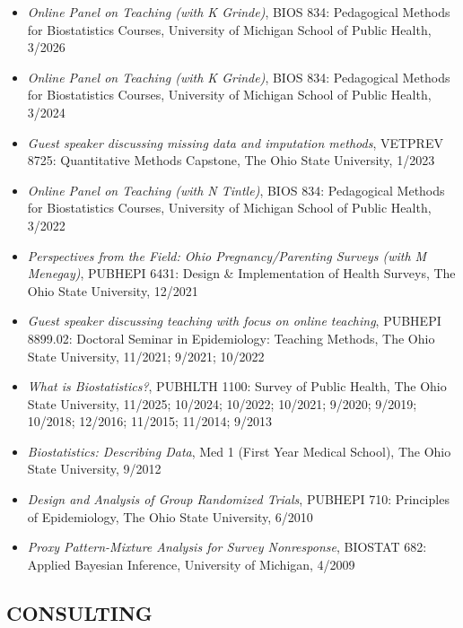 \documentclass[
  english,
  letterpaper,
  DIV=11,
  numbers=noendperiod]{scrartcl}
\providecommand{\tightlist}{%
  \setlength{\itemsep}{0pt}\setlength{\parskip}{0pt}}
\begin{document}
\begin{itemize}
\tightlist
\item
  \emph{Online Panel on Teaching (with K Grinde)}, BIOS 834: Pedagogical
  Methods for Biostatistics Courses, University of Michigan School of
  Public Health, 3/2026
\item
  \emph{Online Panel on Teaching (with K Grinde)}, BIOS 834: Pedagogical
  Methods for Biostatistics Courses, University of Michigan School of
  Public Health, 3/2024
\item
  \emph{Guest speaker discussing missing data and imputation methods},
  VETPREV 8725: Quantitative Methods Capstone, The Ohio State
  University, 1/2023
\item
  \emph{Online Panel on Teaching (with N Tintle)}, BIOS 834: Pedagogical
  Methods for Biostatistics Courses, University of Michigan School of
  Public Health, 3/2022
\item
  \emph{Perspectives from the Field: Ohio Pregnancy/Parenting Surveys
  (with M Menegay)}, PUBHEPI 6431: Design \& Implementation of Health
  Surveys, The Ohio State University, 12/2021
\item
  \emph{Guest speaker discussing teaching with focus on online
  teaching}, PUBHEPI 8899.02: Doctoral Seminar in Epidemiology: Teaching
  Methods, The Ohio State University, 11/2021; 9/2021; 10/2022
\item
  \emph{What is Biostatistics?}, PUBHLTH 1100: Survey of Public Health,
  The Ohio State University, 11/2025; 10/2024; 10/2022; 10/2021; 9/2020;
  9/2019; 10/2018; 12/2016; 11/2015; 11/2014; 9/2013
\item
  \emph{Biostatistics: Describing Data}, Med 1 (First Year Medical
  School), The Ohio State University, 9/2012
\item
  \emph{Design and Analysis of Group Randomized Trials}, PUBHEPI 710:
  Principles of Epidemiology, The Ohio State University, 6/2010
\item
  \emph{Proxy Pattern-Mixture Analysis for Survey Nonresponse}, BIOSTAT
  682: Applied Bayesian Inference, University of Michigan, 4/2009
\end{itemize}

\subsection{CONSULTING}\label{consulting}
\end{document}
